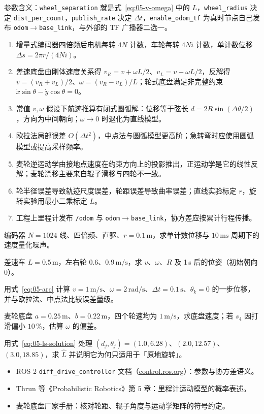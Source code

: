 参数含义：\texttt{wheel\_separation} 就是式~\eqref{eq:05-v-omega} 中的 $L$，\texttt{wheel\_radius} 决定 \texttt{dist\_per\_count}，\texttt{publish\_rate} 决定 $\Delta t$，\texttt{enable\_odom\_tf} 为真时节点自己发布 \texttt{odom}$\to$\texttt{base\_link}，与外部的 TF 广播器二选一。

\begin{summary}

\begin{enumerate}
  \item 增量式编码器四倍频后电机每转 $4N$ 计数，车轮每转 $4Ni$ 计数，单计数位移 $\Delta s=2\pi r/(4Ni)$。
  \item 差速底盘由刚体速度关系得 $v_R=v+\omega L/2$、$v_L=v-\omega L/2$，反解得 $v=(v_R+v_L)/2$、$\omega=(v_R-v_L)/L$；轮式底盘满足非完整约束 $\dot{x}\sin\theta-\dot{y}\cos\theta=0$。
  \item 常值 $v,\omega$ 假设下航迹推算有闭式圆弧解：位移等于弦长 $d=2R\sin(\Delta\theta/2)$，方向为中间朝向；$\omega\to0$ 时退化为直线模型。
  \item 欧拉法局部误差 $O(\Delta t^{2})$，中点法与圆弧模型更高阶；急转弯时应使用圆弧模型或提高采样频率。
  \item 麦轮逆运动学由接地点速度在约束方向上的投影推出，正运动学是它的线性反解；麦轮漂移主要来自辊子滑移与四轮不一致。
  \item 轮半径误差导致轨迹尺度误差，轮距误差导致曲率误差；直线实验标定 $r$，旋转实验用最小二乘标定 $L$。
  \item 工程上里程计发布 \texttt{/odom} 与 \texttt{odom}$\to$\texttt{base\_link}，协方差应按累计行程传播。
\end{enumerate}


\end{summary}

\begin{problemset}

  \item 编码器 $N=1024$ 线、四倍频、直驱、$r=0.1\,\mathrm{m}$，求单计数位移与 $10\,\mathrm{ms}$ 周期下的速度量化噪声。
  \item 差速车 $L=0.5\,\mathrm{m}$，左右轮 $0.6$、$0.9\,\mathrm{m/s}$，求 $v$、$\omega$、$R$ 及 1\,s 后的位姿（初始朝向 0）。
  \item 用式~\eqref{eq:05-arc} 计算 $v=1\,\mathrm{m/s}$、$\omega=2\,\mathrm{rad/s}$、$\Delta t=0.1\,\mathrm{s}$、$\theta_k=0$ 的一步位移，并与欧拉法、中点法比较误差量级。
  \item 麦轮底盘 $a=0.25\,\mathrm{m}$、$b=0.22\,\mathrm{m}$，四个轮速均为 $1\,\mathrm{m/s}$，求底盘速度；若 $s_4$ 因打滑偏小 $10\,\%$，估算 $\omega$ 的偏差。
  \item 用式~\eqref{eq:05-ls-solution} 处理 $(d_j,\theta_j)=(1.0,6.28)$、$(2.0,12.57)$、$(3.0,18.85)$，求 $\hat{L}$ 并说明它为何只适用于「原地旋转」。
\end{problemset}

\begin{reading}

\begin{itemize}
  \item ROS 2 \texttt{diff\_drive\_controller} 文档（\href{https://control.ros.org/}{control.ros.org}）：参数与协方差语义。
  \item Thrun 等《Probabilistic Robotics》第 5 章：里程计运动模型的概率表述。
  \item 麦轮底盘厂家手册：核对轮距、辊子角度与运动学矩阵的符号约定。
\end{itemize}


\end{reading}
